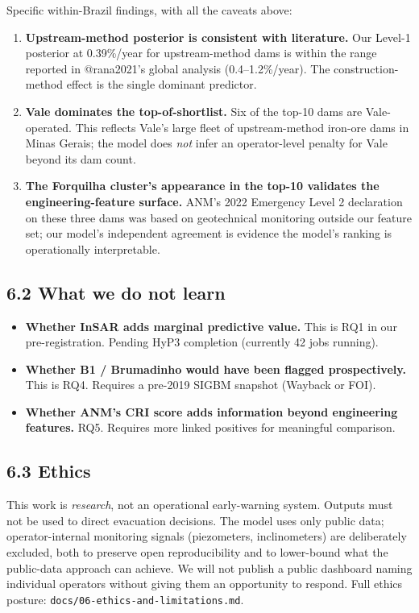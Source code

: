 \documentclass[
  11pt]{article}
\providecommand{\tightlist}{%
  \setlength{\itemsep}{0pt}\setlength{\parskip}{0pt}}
\begin{document}
Specific within-Brazil findings, with all the caveats above:

\begin{enumerate}
\def\labelenumi{\arabic{enumi}.}
\item
  \textbf{Upstream-method posterior is consistent with literature.} Our
  Level-1 posterior at 0.39\%/year for upstream-method dams is within
  the range reported in @rana2021's global analysis (0.4--1.2\%/year).
  The construction-method effect is the single dominant predictor.
\item
  \textbf{Vale dominates the top-of-shortlist.} Six of the top-10 dams
  are Vale-operated. This reflects Vale's large fleet of upstream-method
  iron-ore dams in Minas Gerais; the model does \emph{not} infer an
  operator-level penalty for Vale beyond its dam count.
\item
  \textbf{The Forquilha cluster's appearance in the top-10 validates the
  engineering-feature surface.} ANM's 2022 Emergency Level 2 declaration
  on these three dams was based on geotechnical monitoring outside our
  feature set; our model's independent agreement is evidence the model's
  ranking is operationally interpretable.
\end{enumerate}

\subsection{6.2 What we do not learn}\label{what-we-do-not-learn}

\begin{itemize}
\tightlist
\item
  \textbf{Whether InSAR adds marginal predictive value.} This is RQ1 in
  our pre-registration. Pending HyP3 completion (currently 42 jobs
  running).
\item
  \textbf{Whether B1 / Brumadinho would have been flagged
  prospectively.} This is RQ4. Requires a pre-2019 SIGBM snapshot
  (Wayback or FOI).
\item
  \textbf{Whether ANM's CRI score adds information beyond engineering
  features.} RQ5. Requires more linked positives for meaningful
  comparison.
\end{itemize}

\subsection{6.3 Ethics}\label{ethics}

This work is \emph{research}, not an operational early-warning system.
Outputs must not be used to direct evacuation decisions. The model uses
only public data; operator-internal monitoring signals (piezometers,
inclinometers) are deliberately excluded, both to preserve open
reproducibility and to lower-bound what the public-data approach can
achieve. We will not publish a public dashboard naming individual
operators without giving them an opportunity to respond. Full ethics
posture: \texttt{docs/06-ethics-and-limitations.md}.
\end{document}
